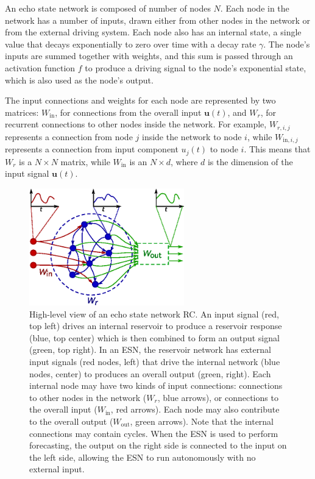 An echo state network is composed of number of nodes $N$. Each node in
the network has a number of inputs, drawn either from other nodes in
the network or from the external driving system. Each node also has an
internal state, a single value that decays exponentially to zero over
time with a decay rate $\gamma$. The node's inputs are summed together
with weights, and this sum is passed through an activation function
$f$ to produce a driving signal to the node's exponential state, which
is also used as the node's output.

The input connections and weights for each node are represented by two
matrices: $W_\text{in}$, for connections from the overall input
$\bm{u}(t)$, and $W_r$, for recurrent connections to other nodes
inside the network. For example, $W_{r,i,j}$ represents a connection
from node $j$ inside the network to node $i$, while
$W_{\text{in},i,j}$ represents a connection from input component
$u_j(t)$ to node $i$. This means that $W_r$ is a $N \times N$ matrix,
while $W_\text{in}$ is an $N \times d$, where $d$ is the dimension of
the input signal $\bm{u}(t)$.

\begin{figure}
  \includegraphics[width=0.6\textwidth]{figures/reservoir}
    \caption{High-level view of an echo state network RC.  An input
    signal (red, top left) drives an internal reservoir to produce a
    reservoir response (blue, top center) which is then combined to
    form an output signal (green, top right). In an ESN, the reservoir
    network has external input signals (red nodes, left) that drive
    the internal network (blue nodes, center) to produces an overall
    output (green, right).  Each internal node may have two kinds of
    input connections: connections to other nodes in the network
    ($W_r$, blue arrows), or connections to the overall input
    ($W_\text{in}$, red arrows). Each node may also contribute to the
    overall output ($W_\text{out}$, green arrows). Note that the
    internal connections may contain cycles.  When the ESN is used to
    perform forecasting, the output on the right side is connected to
    the input on the left side, allowing the ESN to run autonomously
    with no external input.}%
  \label{fig:reservoir}
\end{figure}

